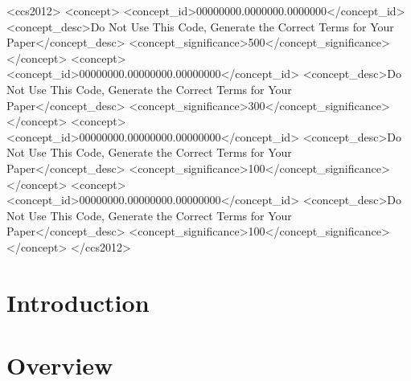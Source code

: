 \documentclass[acmsmall,natbib=false,review,anonymous]{acmart}
\newcommand{\genDir}{_gen}
\begin{document}
\begin{CCSXML}
<ccs2012>
 <concept>
  <concept_id>00000000.0000000.0000000</concept_id>
  <concept_desc>Do Not Use This Code, Generate the Correct Terms for Your Paper</concept_desc>
  <concept_significance>500</concept_significance>
 </concept>
 <concept>
  <concept_id>00000000.00000000.00000000</concept_id>
  <concept_desc>Do Not Use This Code, Generate the Correct Terms for Your Paper</concept_desc>
  <concept_significance>300</concept_significance>
 </concept>
 <concept>
  <concept_id>00000000.00000000.00000000</concept_id>
  <concept_desc>Do Not Use This Code, Generate the Correct Terms for Your Paper</concept_desc>
  <concept_significance>100</concept_significance>
 </concept>
 <concept>
  <concept_id>00000000.00000000.00000000</concept_id>
  <concept_desc>Do Not Use This Code, Generate the Correct Terms for Your Paper</concept_desc>
  <concept_significance>100</concept_significance>
 </concept>
</ccs2012>
\end{CCSXML}





\maketitle

\section{Introduction}


\section{Overview}

\end{document}

